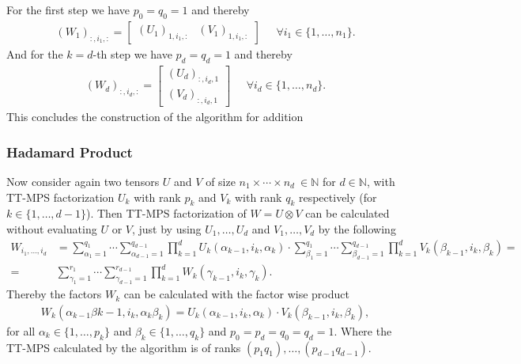 \documentclass[a4paper]{article}
\begin{document}
For the first step we have $p_0 = q_0 = 1$ and thereby
\begin{align}
    (W_1)_{:, i_1, :} = \begin{bmatrix} (U_1)_{1, i_1,:} & (V_1)_{1, i_1, :}
    \end{bmatrix} \;\;\;\;\; \forall i_1 \in \{1, \dots, n_1 \}.
\end{align}
And for the $k=d$-th step we have $p_d = q_d = 1$ and thereby
\begin{align}
    (W_d)_{:, i_d, :} = \begin{bmatrix} (U_d)_{:, i_d,1} \\ (V_d)_{:, i_d, 1}
    \end{bmatrix} \;\;\;\;\; \forall i_d \in \{1, \dots, n_d \}.
\end{align}
This concludes the construction of the algorithm for addition
\subsubsection{Hadamard Product}
Now consider again two tensors $U$ and $V$ of size $n_1 \times \cdots \times n_d \ \in
\mathbb{N}$ for $d \in \mathbb{N}$, with TT-MPS factorization $U_k$ with rank
$p_k$ and $V_k$ with rank $q_k$ respectively (for $k \in \{1, \dots ,d-1\}$).
Then TT-MPS factorization of $W = U \otimes V$ can be calculated without
evaluating $U$ or $V$, just by using $U_1, \dots, U_{d}$ and $V_1, \dots,
V_d$ by the following
\begin{align}
    W_{i_1, \dots, i_d} &= \sum_{\alpha_1 = 1}^{q_1} \cdots \sum_{\alpha_{d-1}
    = 1}^{q_{d-1}} \prod_{k=1}^d U_k(\alpha_{k-1}, i_k, \alpha_k) \cdot
    \sum_{\beta_1 = 1}^{q_1} \cdots \sum_{\beta_{d-1}
        = 1}^{q_{d-1}} \prod_{k=1}^d V_k(\beta_{k-1}, i_k, \beta_k)
        =\nonumber\\
        =&
    \sum_{\gamma_1 = 1}^{r_1} \cdots \sum_{\gamma_{d-1}
        = 1}^{r_{d-1}} \prod_{k=1}^d W_k(\gamma_{k-1}, i_k, \gamma_k).
\end{align}
Thereby the factors $W_k$ can be calculated with the factor wise product
\begin{align}
    W_k(\alpha_{k-1}\beta{k-1}, i_k, \alpha_k\beta_k) = U_k(\alpha_{k-1},
    i_k, \alpha_k) \cdot V_k(\beta_{k-1}, i_k, \beta_k),
\end{align}
for all $\alpha_{k} \in \{1, \dots, p_{k}\}$ and $\beta_k \in \{1, \dots,
q_k\}$ and $p_0 = p_d = q_0 = q_d = 1$. Where the TT-MPS calculated by the
algorithm is of ranks $(p_1q_1), \dots, (p_{d-1} q_{d-1})$.
\end{document}
